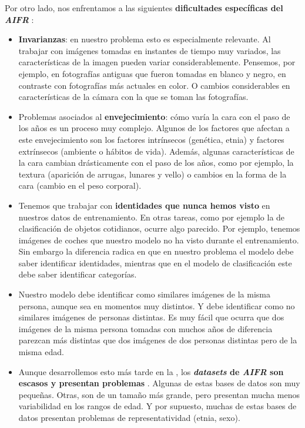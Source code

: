 Por otro lado, nos enfrentamos a las siguientes \textbf{dificultades específicas del \textit{AIFR}} \cite{informatica:challenges_retrieval}:

\begin{itemize}
	\item \textbf{Invarianzas}: en nuestro problema esto es especialmente relevante. Al trabajar con imágenes tomadas en instantes de tiempo muy variados, las características de la imagen pueden variar considerablemente. Pensemos, por ejemplo, en fotografías antiguas que fueron tomadas en blanco y negro, en contraste con fotografías más actuales en color. O cambios considerables en características de la cámara con la que se toman las fotografías.

	\item Problemas asociados al \textbf{envejecimiento}: cómo varía la cara con el paso de los años es un proceso muy complejo. Algunos de los factores que afectan a este envejecimiento \cite{informatica:tecnica_sintesis_aifr} son los factores intrínsecos (genética, etnia) y factores extrínsecos (ambiente o hábitos de vida). Además, algunas características de la cara cambian drásticamente con el paso de los años, como por ejemplo, la textura (aparición de arrugas, lunares y vello) o cambios en la forma de la cara (cambio en el peso corporal).

	\item Tenemos que trabajar con \textbf{identidades que nunca hemos visto} en nuestros datos de entrenamiento. En otras tareas, como por ejemplo la de clasificación de objetos cotidianos, ocurre algo parecido. Por ejemplo, tenemos imágenes de coches que nuestro modelo no ha visto durante el entrenamiento. Sin embargo la diferencia radica en que en nuestro problema el modelo debe saber identificar identidades, mientras que en el modelo de clasificación este debe saber identificar categorías.

	\item Nuestro modelo debe identificar como similares imágenes de la misma persona, aunque sea en momentos muy distintos. Y debe identificar como no similares imágenes de personas distintas. Es muy fácil que ocurra que dos imágenes de la misma persona tomadas con muchos años de diferencia parezcan más distintas que dos imágenes de dos personas distintas pero de la misma edad.

	\item Aunque desarrollemos esto más tarde en la , los \textbf{\textit{datasets} de \textit{AIFR} son escasos y presentan problemas} \cite{informatica:tecnica_sintesis_aifr}. Algunas de estas bases de datos son muy pequeñas. Otras, son de un tamaño más grande, pero presentan mucha menos variabilidad en los rangos de edad. Y por supuesto, muchas de estas bases de datos presentan problemas de representatividad (etnia, sexo).


\end{itemize}
